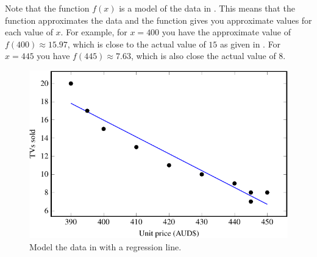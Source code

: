 \documentclass[a4paper,oneside,12pt]{article}
\begin{document}
Note that the function $f(x)$ is a model of the data in
.  This means that the function approximates the
data and the function gives you approximate values for each value of
$x$.  For example, for $x = 400$ you have the approximate value of
$f(400) \approx 15.97$, which is close to the actual value of $15$ as
given in .  For $x = 445$ you have
$f(445) \approx 7.63$, which is also close the actual value of $8$.

\begin{table}[!htbp]
\centering

\caption{%
  Details of how to use the formulae
  in~\eqref{eqn:linear_regression_alpha_hat_beta_hat} to calculate the
  regression line for the data in .  In most cases,
  you would need to round a number to two, four, or six decimal places
  in order to fit a table.  However, you should not round a number
  when you are calculating the values for $\alphahat$ and $\betahat$.
  The rounding should only be done after you have calculated the
  values for $\alphahat$ and $\betahat$.
}
\label{tab:fantastic_tv_details_regression_line}
\end{table}

\begin{figure}[!htbp]
\centering
\includegraphics[scale=1.1]{image/07/fantastic-tv-regression.pdf}
\caption{%
  Model the data in  with a regression line.
}
\label{fig:fantastic_tv_regression}
\end{figure}

\begin{table}[!htbp]
\centering

\caption{%
  The age~(in years) and systolic blood pressure of $30$ people.
}
\label{tab:blood_pressure}
\end{table}
\end{document}
